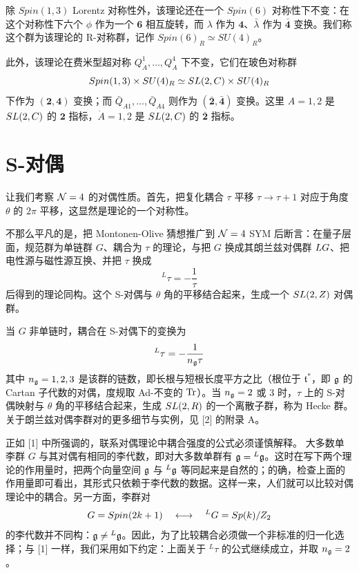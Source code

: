 除 $Spin(1,3)$ Lorentz 对称性外，该理论还在一个 $Spin(6)$ 对称性下不变：在这个对称性下六个 $\phi$ 作为一个 $\mathbf{6}$ 相互旋转，而 $\lambda$ 作为 $\mathbf{4}$、$\bar\lambda$ 作为 $\bar{\mathbf{4}}$ 变换。我们称这个群为该理论的 R-对称群，记作 $Spin(6)_R\simeq SU(4)_R$。

此外，该理论在费米型超对称 $Q^1_{\dot A},\dots,Q^4_{\dot A}$ 下不变，它们在玻色对称群
\[ Spin(1,3)\times SU(4)_R \simeq SL(2,C)\times SU(4)_R \]
下作为 $(\mathbf{2},\mathbf{4})$ 变换；而 $\bar Q_{A1},\dots,\bar Q_{A4}$ 则作为 $(\bar{\mathbf{2}},\bar{\mathbf{4}})$ 变换。这里 $A=1,2$ 是 $SL(2,C)$ 的 $\mathbf{2}$ 指标，$\dot A=1,2$ 是 $SL(2,C)$ 的 $\bar{\mathbf{2}}$ 指标。

\section{S-对偶}

让我们考察 $\mathcal{N}=4$ 的对偶性质。首先，把复化耦合 $\tau$ 平移 $\tau\to\tau+1$ 对应于角度 $\theta$ 的 $2\pi$ 平移，这显然是理论的一个对称性。

不那么平凡的是，把 Montonen-Olive 猜想推广到 $\mathcal{N}=4$ SYM 后断言：在量子层面，规范群为单链群 $G$、耦合为 $\tau$ 的理论，与把 $G$ 换成其朗兰兹对偶群 $LG$、把电性源与磁性源互换、并把 $\tau$ 换成
\[ {}^L\tau = -\frac{1}{\tau} \]
后得到的理论同构。这个 S-对偶与 $\theta$ 角的平移结合起来，生成一个 $SL(2,Z)$ 对偶群。

当 $G$ 非单链时，耦合在 S-对偶下的变换为
\[ {}^L\tau = -\frac{1}{n_{\mathfrak{g}}\tau} \]
其中 $n_{\mathfrak{g}}=1,2,3$ 是该群的链数，即长根与短根长度平方之比（根位于 $\mathfrak{t}^*$，即 $\mathfrak{g}$ 的 Cartan 子代数的对偶，度规取 Ad-不变的 $\operatorname{Tr}$）。当 $n_{\mathfrak{g}}=2$ 或 $3$ 时，$\tau$ 上的 S-对偶映射与 $\theta$ 角的平移结合起来，生成 $SL(2,R)$ 的一个离散子群，称为 Hecke 群。关于朗兰兹对偶李群对的更多细节与实例，见 [2] 的附录 A。

正如 [1] 中所强调的，联系对偶理论中耦合强度的公式必须谨慎解释。
大多数单李群 $G$ 与其对偶有相同的李代数，即对大多数单群有 $\mathfrak{g}={}^{L}\mathfrak{g}$。这时在写下两个理论的作用量时，把两个向量空间 $\mathfrak{g}$ 与 ${}^{L}\mathfrak{g}$ 等同起来是自然的；的确，检查上面的作用量即可看出，其形式只依赖于李代数的数据。这样一来，人们就可以比较对偶理论中的耦合。另一方面，李群对
\[ G = Spin(2k+1) \quad\longleftrightarrow\quad {}^LG = Sp(k)/Z_2 \]
的李代数并不同构：$\mathfrak{g}\neq{}^{L}\mathfrak{g}$。因此，为了比较耦合必须做一个非标准的归一化选择；与 [1] 一样，我们采用如下约定：上面关于 ${}^L\tau$ 的公式继续成立，并取 $n_{\mathfrak{g}}=2$。


